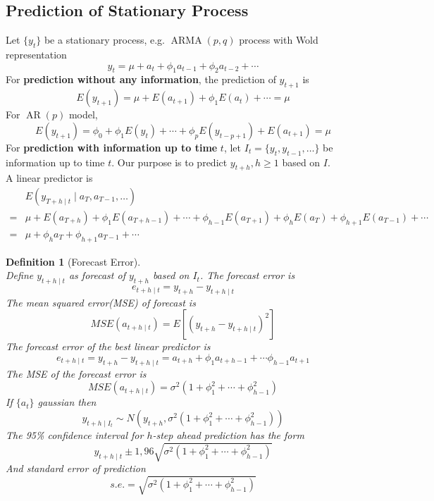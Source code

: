 \documentclass[12pt]{article}
\newtheorem{definition}{Definition}[section]
\theoremstyle{definition}
\DeclareMathOperator{\ARMA}{ARMA}
\DeclareMathOperator{\AR}{AR}
\begin{document}
\subsection{Prediction of Stationary Process}
Let $\{y_t\}$ be a stationary process, e.g. $\ARMA(p,q)$ process with Wold representation
\[
y_t = \mu + a_t + \phi_1 a_{t-1} + \phi_2 a_{t-2} + \cdots
\]
For \textbf{prediction without any information}, the prediction of $y_{t+1}$ is
\[
E(y_{t+1}) = \mu + E(a_{t+1}) + \phi_1E(a_{t}) + \cdots = \mu
\]
For $\AR(p)$ model,
\[
E(y_{t+1}) = \phi_0 + \phi_1E(y_t) + \cdots + \phi_pE(y_{t-p+1}) + E(a_{t+1}) = \mu
\]
For \textbf{prediction with information up to time} $t$, let $I_t = \{y_t, y_{t-1}, \ldots\}$ be information up to time $t$. Our purpose is to predict $y_{t+h}, h\geq 1$ based on $I$.\\
A linear predictor is
\begin{align*}
&E(y_{T+h\mid t}\mid a_{T}, a_{T-1}, \ldots)\\
=&\mu + E(a_{T+h}) + \phi_1E(a_{T+h-1}) + \cdots + \phi_{h-1}E(a_{T+1}) + \phi_hE(a_T) + \phi_{h+1}E(a_{T-1}) + \cdots\\
=&\mu + \phi_ha_T + \phi_{h+1}a_{T-1} + \cdots
\end{align*}
\begin{definition}[Forecast Error]
\hfill\\\normalfont Define $y_{t+h\mid t}$ as forecast of $y_{t+h}$ based on $I_t$. The forecast error is
\[
e_{t+h\mid t} = y_{t+h}-y_{t+h\mid t}
\]
The mean squared error(MSE) of forecast is
\[
MSE(a_{t+h\mid t}) = E[(y_{t+h}-y_{t+h\mid t})^2]
\]
The forecast error of the best linear predictor is
\[
e_{t+h\mid t} = y_{t+h}-y_{t+h\mid t} = a_{t+h} + \phi_1 a_{t+h-1} + \cdots \phi_{h-1}a_{t+1}
\]
The MSE of the forecast error is
\[
MSE(a_{t+h\mid t}) = \sigma^2 (1 + \phi_1^2 + \cdots + \phi_{h-1}^2)
\]
If $\{a_t\}$ gaussian then
\[
y_{t+h\mid I_t}\sim N(y_{t+h}, \sigma^2 ( 1+ \phi_1^2 + \cdots + \phi_{h-1}^2))
\]
The 95\% confidence interval for $h$-step ahead prediction has the form 
\[
y_{t+h\mid t} \pm 1,96 \sqrt{\sigma^2 (1 + \phi_1^2 + \cdots + \phi_{h-1}^2)}
\]
And standard error of prediction
\[
s.e. = \sqrt{\sigma^2 (1 + \phi_1^2 + \cdots + \phi_{h-1}^2)}
\]
\end{definition}
\clearpage
\end{document}

